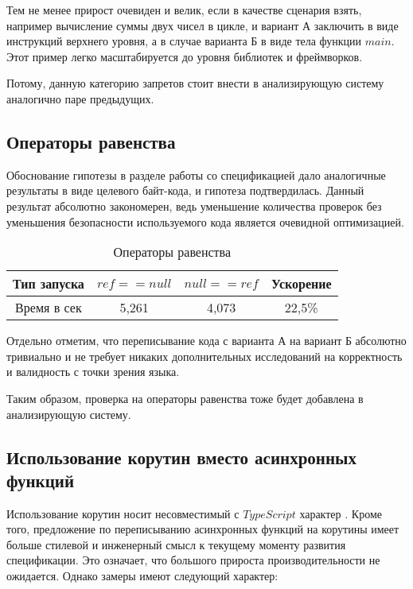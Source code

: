 \documentclass{mipt-thesis-bs}
\begin{document}
Тем не менее прирост очевиден и велик, если в качестве сценария взять, например
вычисление суммы двух чисел в цикле, и вариант А заключить в виде инструкций верхнего
уровня, а в случае варианта Б в виде тела функции $main$. Этот пример легко
масштабируется до уровня библиотек и фреймворков.

Потому, данную категорию запретов стоит внести в анализирующую систему аналогично
паре предыдущих.


\subsection{Операторы равенства}

Обоснование гипотезы в разделе работы со спецификацией дало аналогичные
результаты в виде целевого байт-кода, и гипотеза подтвердилась. Данный результат
абсолютно закономерен, ведь уменьшение количества проверок без уменьшения
безопасности используемого кода является очевидной оптимизацией.

\begin{table}[h]
    \centering
    \begin{tabular}{|c|c|c|c|}
      \hline
      Тип запуска & $ref == null$ & $null == ref$ & Ускорение \\
      \hline
      Время в сек & 5,261 & 4,073 & 22,5\% \\
      \hline
    \end{tabular}
    \caption{Операторы равенства}
  \end{table}

Отдельно отметим, что переписывание
кода с варианта А на вариант Б абсолютно тривиально и не требует никаких дополнительных
исследований на корректность и валидность с точки зрения языка.

Таким образом, проверка
на операторы равенства тоже будет добавлена в анализирующую систему.

\subsection{Использование корутин вместо асинхронных функций}

Использование корутин носит несовместимый с $TypeScript$ характер \cite{tsspec}. Кроме того,
предложение по переписыванию асинхронных функций на корутины имеет больше стилевой
и инженерный смысл к текущему моменту развития спецификации. Это означает, что
большого прироста производительности не ожидается. Однако замеры имеют следующий характер:
\end{document}
